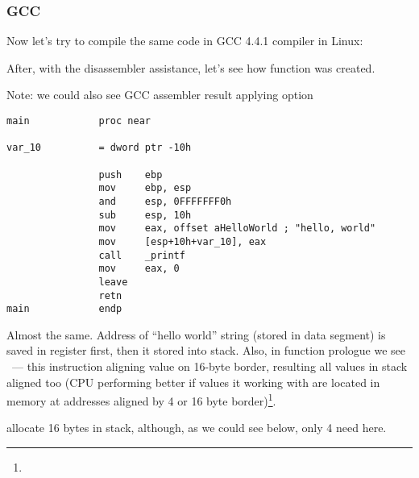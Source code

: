 \subsubsection{GCC}

{Now let's try to compile the same \CCpp code in GCC 4.4.1 compiler in Linux}: 

{After, with the \IDA disassembler assistance, let's see how \main function was created.} 

{Note: we could also see GCC assembler result applying option} 

\begin{lstlisting}
main            proc near

var_10          = dword ptr -10h

                push    ebp
                mov     ebp, esp
                and     esp, 0FFFFFFF0h
                sub     esp, 10h
                mov     eax, offset aHelloWorld ; "hello, world"
                mov     [esp+10h+var_10], eax
                call    _printf
                mov     eax, 0
                leave
                retn
main            endp
\end{lstlisting}

{Almost the same.
Address of ``hello world'' string (stored in data segment) is saved in \EAX register first, then it stored into stack.
Also, in function prologue we see  ~--- 
this instruction aligning \ESP value on 16-byte border, resulting all values in stack aligned too
(CPU performing better if values it working with are located in memory at addresses aligned by 
4 or 16 byte border)\footnote{\URLWPDA}.}

 
{allocate 16 bytes in stack, although, as we could see below, only 4 need here.} 

